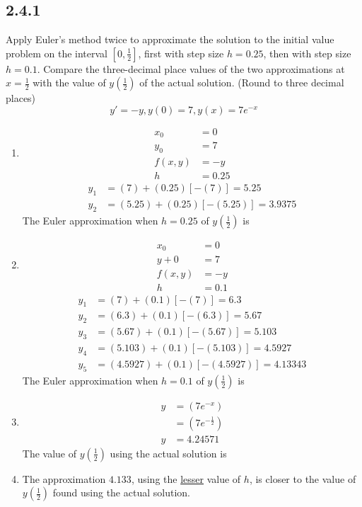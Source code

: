 \documentclass{article}
\begin{document}
\subsection{2.4.1}
Apply Euler's method twice to approximate the solution to the initial value problem on the interval $ \left[ 0,\frac{1}{2} \right] $, first with step size $ h = 0.25 $, then with step size $ h = 0.1 $. Compare the three-decimal place values of the two approximations at $ x = \frac{1}{2} $ with the value of $ y \left( \frac{1}{2} \right) $ of the actual solution. (Round to three decimal places)
$$ y' = -y, y(0) = 7, y(x) = 7e^{-x} $$
\begin{enumerate}[label=\textbf{(\alph*)}]
	\item
		\begin{align*}
			x_0 & = 0 \\
			y_0 & = 7 \\
			f(x,y) & = -y \\
			h & = 0.25
		\end{align*}
		\begin{align*}
			y_1 & = (7) + (0.25) \left[ -(7) \right] = 5.25 \\
			y_2 & = (5.25) + (0.25) \left[ -(5.25) \right] = 3.9375
		\end{align*}
		The Euler approximation when $ h = 0.25 $ of $ y \left( \frac{1}{2} \right) $ is 
	\item
		\begin{align*}
			x_0 & = 0 \\
			y+0 & = 7 \\
			f(x,y) & = -y \\
			h & = 0.1
		\end{align*}
		\begin{align*}
			y_1 & = (7) + (0.1) \left[ -(7) \right] = 6.3 \\
			y_2 & = (6.3) + (0.1) \left[ -(6.3) \right] = 5.67 \\
			y_3 & = (5.67) + (0.1) \left[ -(5.67) \right] = 5.103 \\
			y_4 & = (5.103) + (0.1) \left[ -(5.103) \right] = 4.5927 \\
			y_5 & = (4.5927) + (0.1) \left[ -(4.5927) \right] = 4.13343
		\end{align*}
		The Euler approximation when $ h = 0.1 $ of $ y \left( \frac{1}{2} \right) $ is 
	\item
		\begin{align*}
			y & = \left( 7e^{-x} \right) \\
			  & = \left( 7e^{-\frac{1}{2}} \right) \\
			y & = 4.24571
		\end{align*}
		The value of $ y \left( \frac{1}{2} \right) $ using the actual solution is 
	\item
		The approximation $ 4.133 $, using the \underline{lesser} value of $ h $, is closer to the value of $ y \left( \frac{1}{2} \right) $ found using the actual solution.
\end{enumerate}
\end{document}

